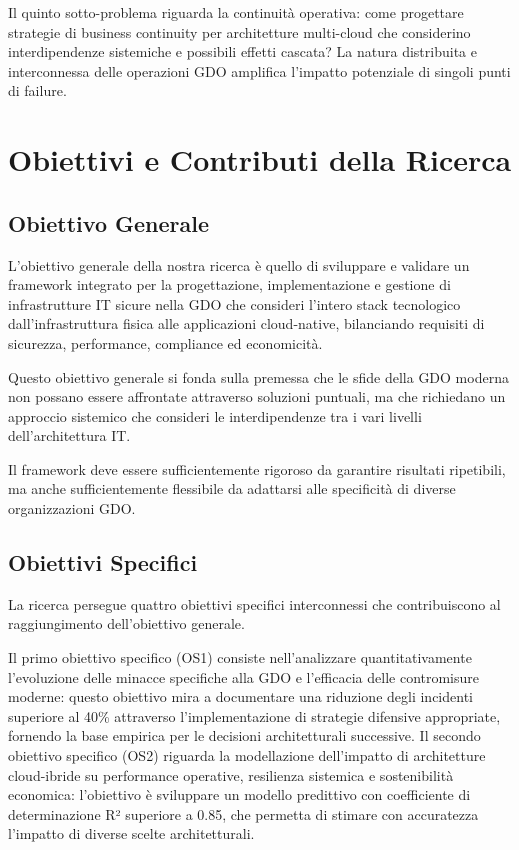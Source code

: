 \documentclass[12pt,a4paper,oneside]{book}
\numberwithin{figure}{chapter} %
\numberwithin{table}{chapter}  %
\begin{document}
Il quinto sotto-problema riguarda la continuità operativa: come
progettare strategie di business continuity per architetture multi-cloud
che considerino interdipendenze sistemiche e possibili effetti cascata?
La natura distribuita e interconnessa delle operazioni GDO amplifica
l'impatto potenziale di singoli punti di failure.

\section{\texorpdfstring{\textbf{Obiettivi e Contributi della
Ricerca}}{1.3 Obiettivi e Contributi della Ricerca}}\label{obiettivi-e-contributi-della-ricerca}

\subsection{\texorpdfstring{\textbf{Obiettivo
Generale}}{1.3.1 Obiettivo Generale}}\label{obiettivo-generale}

L'obiettivo generale della nostra ricerca è quello di sviluppare e
validare un framework integrato per la progettazione, implementazione e
gestione di infrastrutture IT sicure nella GDO che consideri l'intero
stack tecnologico dall'infrastruttura fisica alle applicazioni
cloud-native, bilanciando requisiti di sicurezza, performance,
compliance ed economicità.

Questo obiettivo generale si fonda sulla premessa che le sfide della GDO
moderna non possano essere affrontate attraverso soluzioni puntuali, ma
che richiedano un approccio sistemico che consideri le interdipendenze
tra i vari livelli dell'architettura IT.

Il framework deve essere sufficientemente rigoroso da garantire
risultati ripetibili, ma anche sufficientemente flessibile da adattarsi
alle specificità di diverse organizzazioni GDO.

\subsection{\texorpdfstring{\textbf{Obiettivi
Specifici}}{1.3.2 Obiettivi Specifici}}\label{obiettivi-specifici}

La ricerca persegue quattro obiettivi specifici interconnessi che
contribuiscono al raggiungimento dell'obiettivo generale.

Il primo obiettivo specifico (OS1) consiste nell'analizzare
quantitativamente l'evoluzione delle minacce specifiche alla GDO e
l'efficacia delle contromisure moderne: questo obiettivo mira a
documentare una riduzione degli incidenti superiore al 40\% attraverso l'implementazione di strategie difensive appropriate, fornendo la base empirica per le decisioni architetturali successive.
Il secondo obiettivo specifico (OS2) riguarda la modellazione
dell'impatto di architetture cloud-ibride su performance operative, resilienza sistemica e sostenibilità economica: l'obiettivo è sviluppare un modello predittivo con coefficiente di determinazione R² superiore a 0.85, che permetta di stimare con accuratezza l'impatto di diverse scelte architetturali.
\end{document}
